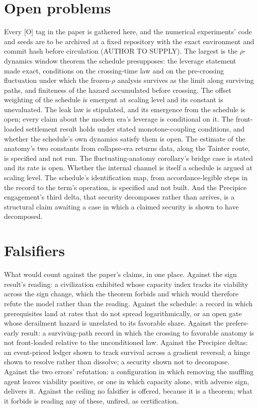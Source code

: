 \documentclass[11pt]{article}
\theoremstyle{plain}
\theoremstyle{definition}
\theoremstyle{remark}
\begin{document}
\section{Open problems}\label{sec:open}

Every [O] tag in the paper is gathered here, and the numerical
experiments' code and seeds are to be archived at a fixed repository
with the exact environment and commit hash before circulation (AUTHOR
TO SUPPLY). The largest is the
$\rho$-dynamics window theorem the schedule presupposes: the leverage
statement made exact, conditions on the crossing-time law and on the
pre-crossing fluctuation under which the frozen-$\rho$ analysis survives
as the limit along surviving paths, and finiteness of the hazard
accumulated before crossing. The
offset weighting of the schedule is emergent at scaling level and its
constant is unevaluated. The leak law is stipulated, and its emergence
from the schedule is open; every claim about the modern era's leverage
is conditional on it. The front-loaded settlement result holds under
stated monotone-coupling conditions, and whether the schedule's own
dynamics satisfy them is open. The estimate
of the anatomy's two constants from collapse-era returns data, along the
Tainter route, is specified and not run. The fluctuating-anatomy
corollary's bridge case is stated and its rate is open. Whether the
internal channel is itself a schedule is argued at scaling level. The
schedule's identification map, from accordance-legible steps in the
record to the term's operation, is specified and not built. And the
Precipice engagement's third delta, that security decomposes rather than
arrives, is a structural claim awaiting a case in which a claimed security
is shown to have decomposed.

\section{Falsifiers}\label{sec:falsifiers}

What would count against the paper's claims, in one place. Against the
sign result's reading: a civilization exhibited whose capacity index
tracks its viability across the sign change, which the theorem forbids
and which would therefore refute the model rather than the reading.
Against the schedule: a record in which prerequisites land at rates
that do not spread logarithmically, or an open gate whose derailment
hazard is unrelated to its favorable share. Against the prefers-early
result: a surviving-path record in which the crossing to favorable
anatomy is not front-loaded relative to the unconditioned law. Against
the Precipice deltas: an event-priced ledger shown to track survival
across a gradient reversal; a hinge shown to resolve rather than
dissolve; a security shown not to decompose. Against the two errors'
refutation: a configuration in which removing the muffling agent leaves
viability positive, or one in which capacity alone, with adverse sign,
delivers it. Against the ceiling no falsifier is offered, because it is a
theorem; what it forbids is reading any of these, unfired, as
certification.
\end{document}
